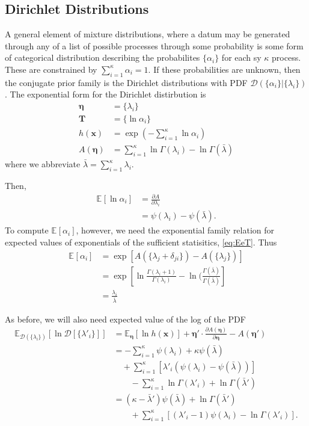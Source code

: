 \documentclass[aps,showpacs,twocolumn,prd,superscriptaddress,nofootinbib]{revtex4}
\newcommand{\nn}{\nonumber}
\newcommand{\E}[1]{{\mathbb E}_{#1}\!}
\begin{document}
\subsection{Dirichlet Distributions}
A general element of mixture distributions, where a datum may be generated through any of a list of possible processes through some probability is some form of categorical distribution describing the probabilites $\{\alpha_i\}$ for each sy $\kappa$ process.  These are constrained by $\sum_{i=1}^\kappa\alpha_i=1$. If these probabilities are unknown, then the conjugate prior family is the Dirichlet distributions with PDF $\mathcal{D}\left(\{\alpha_i\}|\{\lambda_i\}\right)$.  The exponential form for the Dirichlet distirbution is
\begin{align*}
\bm\eta&=\{\lambda_i\}\\
\bm T&=\{\ln\alpha_i\}\\
h(\bm x)&=\exp\left(-\sum_{i=1}^\kappa\ln\alpha_i\right)\\
A(\bm\eta)&=\sum_{i=1}^\kappa\ln\Gamma(\lambda_i)-\ln\Gamma(\bar\lambda)
\end{align*}
where we abbreviate $\bar\lambda=\sum_{i=1}^\kappa\lambda_i$.

Then, 
\begin{align}
\E{}\left[\ln\alpha_i\right] 
&=\frac{\partial A}{\partial\lambda_{i}}\nn\\
&=\psi(\lambda_i)-\psi(\bar\lambda).\label{eq:Elnalpha}
\end{align}
To compute $\E{}\left[\alpha_i\right]$, however, we need the exponential family relation for expected values of exponentials of the sufficient statisitics, \eqref{eq:EeT}. Thus
\begin{align*}
  \E{}\left[\alpha_i\right]
  &=\exp\left[A(\{\lambda_j+\delta_{ji}\})-A(\{\lambda_j\})\right]\\
  &=\exp\left[\ln\frac{\Gamma(\lambda_i+1)}{\Gamma(\lambda_i)}-\ln(\frac{\Gamma(\bar\lambda)}{\Gamma(\bar\lambda)}\right]\\
  &=\frac{\lambda_i}{\bar\lambda}
\end{align*}

As before, we will also need expected value of the log of the PDF
\begin{align}
    \E{\mathcal{D}(\{\lambda_i\})}\left[\ln{\mathcal{D}[\{\lambda'_i\}]}\right]
    &=\E{\bm\eta}\left[\ln{h(\bm x)}\right]+\bm\eta' \cdot \frac{\partial A(\bm\eta)}{\partial\bm\eta} -A({\bm\eta'})\nn\\
    &=-\sum_{i=1}^\kappa\psi(\lambda_i)+\kappa\psi(\bar\lambda)\nn\\
    &\quad+\sum_{i=1}^\kappa\left[\lambda'_i(\psi(\lambda_i)-\psi(\bar\lambda))\right]\nn\\
    &\qquad-\sum_{i=1}^\kappa\ln\Gamma(\lambda'_i)+\ln\Gamma(\bar\lambda')\nn\\
    &=(\kappa-\bar\lambda')\psi(\bar\lambda)+\ln\Gamma(\bar\lambda')\nn\\
    &\qquad+\sum_{i=1}^\kappa\left[(\lambda'_i-1)\psi(\lambda_i)-\ln\Gamma(\lambda'_i)\right].
    \label{eq:ElnD}
\end{align}
\end{document}
